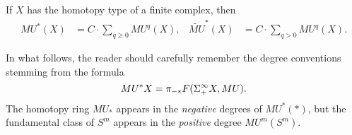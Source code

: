 \begin{theorem}\label{CGenerationForFiniteCplx}
If \(X\) has the homotopy type of a finite complex, then
\begin{align*}
MU^*(X) & = C \cdot \sum_{q \ge 0} MU^q(X), &
\widetilde{MU}^*(X) & = C \cdot \sum_{q > 0} MU^q(X).
\end{align*}
\end{theorem}
\begin{remark}
In what follows, the reader should carefully remember the degree conventions stemming from the formula \[MU^* X = \pi_{-*} F(\Sigma^\infty_+ X, MU).\]  The homotopy ring \(MU_*\) appears in the \emph{negative} degrees of \(MU^*(*)\), but the fundamental class of \(S^m\) appears in the \emph{positive} degree \(MU^m(S^m)\).
\end{remark}
